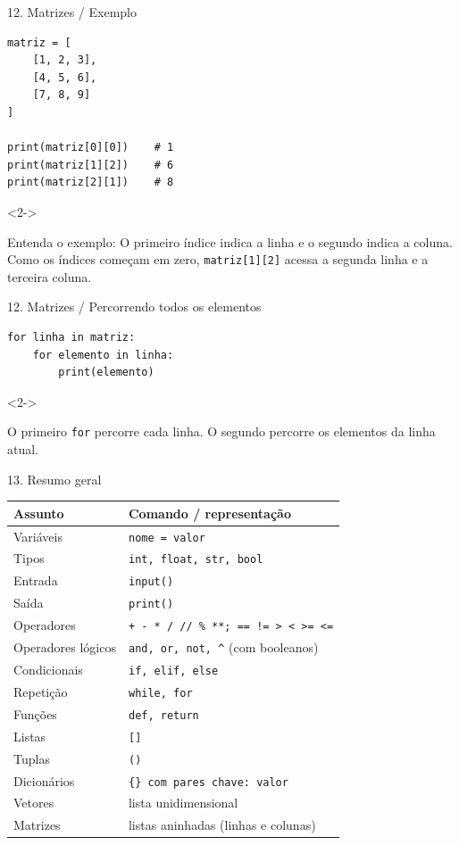 \begin{frame}[fragile,t]{12. Matrizes / Exemplo}
\begin{lstlisting}
matriz = [
    [1, 2, 3],
    [4, 5, 6],
    [7, 8, 9]
]

print(matriz[0][0])    # 1
print(matriz[1][2])    # 6
print(matriz[2][1])    # 8
\end{lstlisting}
\begin{visibleenv}<2->
\begin{EMASCnote}
Entenda o exemplo: O primeiro índice indica a linha e o segundo indica a coluna. Como os índices começam em zero, \texttt{matriz[1][2]} acessa a segunda linha e a terceira coluna.
\end{EMASCnote}
\end{visibleenv}
\end{frame}

\begin{frame}[fragile,t]{12. Matrizes / Percorrendo todos os elementos}
\begin{lstlisting}
for linha in matriz:
    for elemento in linha:
        print(elemento)
\end{lstlisting}
\begin{visibleenv}<2->
\begin{EMASCnote}
O primeiro \texttt{for} percorre cada linha. O segundo percorre os elementos da linha atual.
\end{EMASCnote}
\end{visibleenv}
\end{frame}

\begin{frame}[t]{13. Resumo geral}
\footnotesize
\renewcommand{\arraystretch}{0.95}
\begin{tabularx}{\linewidth}{@{}lX@{}}
\toprule
\textbf{Assunto} & \textbf{Comando / representação} \\
\midrule
Variáveis & \texttt{nome = valor} \\
Tipos & \texttt{int, float, str, bool} \\
Entrada & \texttt{input()} \\
Saída & \texttt{print()} \\
Operadores & \texttt{+ - * / // \% **; == != \textgreater{} \textless{} \textgreater{}= \textless{}=} \\
Operadores lógicos & \texttt{and, or, not, \textasciicircum} (com booleanos) \\
Condicionais & \texttt{if, elif, else} \\
Repetição & \texttt{while, for} \\
Funções & \texttt{def, return} \\
Listas & \texttt{[]} \\
Tuplas & \texttt{()} \\
Dicionários & \texttt{\{\} com pares chave: valor} \\
Vetores & lista unidimensional \\
Matrizes & listas aninhadas (linhas e colunas) \\
\bottomrule
\end{tabularx}
\end{frame}
